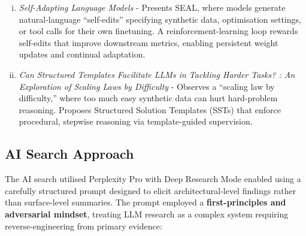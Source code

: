 \documentclass[a4paper,oneside,12pt]{book}
\numberwithin{equation}{chapter} %
\begin{document}
\begin{enumerate} [(i)]
\item \cite{zweiger2025selfadaptinglanguagemodels} \textit{Self-Adapting Language Models} - Presents SEAL, where models generate natural-language “self-edits” specifying synthetic data, optimisation settings, or tool calls for their own finetuning. A reinforcement-learning loop rewards self-edits that improve downstream metrics, enabling persistent weight updates and continual adaptation. 
\item \cite{yang2025structuredtemplatesfacilitatellms} \textit{Can Structured Templates Facilitate LLMs in Tackling Harder Tasks? : An Exploration of Scaling Laws by Difficulty} - Observes a “scaling law by difficulty,” where too much easy synthetic data can hurt hard-problem reasoning. Proposes Structured Solution Templates (SSTs) that enforce procedural, stepwise reasoning via template-guided supervision.
\end{enumerate}

\subsection{AI Search Approach}

The AI search utilised Perplexity Pro with Deep Research Mode enabled using a carefully structured prompt designed to elicit architectural-level findings rather than surface-level summaries. The prompt employed a \textbf{first-principles and adversarial mindset}, treating LLM research as a complex system requiring reverse-engineering from primary evidence:
\end{document}
